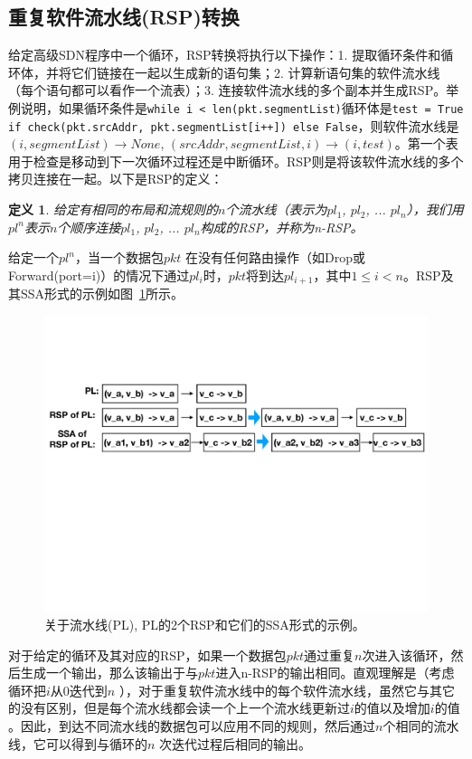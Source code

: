 \documentclass{ctexart}
\newcommand{\codeword}[1]{\texttt{\small{#1}}}
\newtheorem{definition}{定义}
\begin{document}
\subsection{重复软件流水线(RSP)转换}

给定高级SDN程序中一个循环，RSP转换将执行以下操作：1. 提取循环条件和循环体，并将它们链接在一起以生成新的语句集；2. 计算新语句集的软件流水线（每个语句都可以看作一个流表）；3. 连接软件流水线的多个副本并生成RSP。举例说明，如果循环条件是\codeword{while i < len(pkt.segmentList)}循环体是\codeword{test = True if check(pkt.srcAddr, pkt.segmentList[i++]) else False}，则软件流水线是 $(i, segmentList) \rightarrow None$, $(srcAddr, segmentList, i) \rightarrow (i, test)$。第一个表用于检查是移动到下一次循环过程还是中断循环。RSP则是将该软件流水线的多个拷贝连接在一起。以下是RSP的定义：

\begin{definition}
给定有相同的布局和流规则的$n$个流水线（表示为$pl_1$, $pl_2$, ... $pl_n$），我们用$pl^n$表示$n$个顺序连接$pl_1$, $pl_2$, ... $pl_n$构成的RSP，并称为n-RSP。
\end{definition}

给定一个$pl^n$，当一个数据包$pkt$ 在没有任何路由操作（如Drop或Forward(port=i)）的情况下通过$pl_i$时，$pkt$将到达$pl_{i+1}$，其中$1 \leq i < n$。RSP及其SSA形式的示例如图~\ref{fig:pipelines}所示。

\begin{figure}[!htbp]
\includegraphics[width=0.8\linewidth]{figures/lp-66.pdf}
\centering
\vspace{-3mm}
\caption{\small 关于流水线(PL), PL的2个RSP和它们的SSA形式的示例。}
\label{fig:pipelines}
\end{figure}

对于给定的循环及其对应的RSP，如果一个数据包$pkt$通过重复$n$次进入该循环，然后生成一个输出，那么该输出于与$pkt$进入n-RSP的输出相同。直观理解是（考虑循环把$i$从$0$迭代到$n$ ），对于重复软件流水线中的每个软件流水线，虽然它与其它的没有区别，但是每个流水线都会读一个上一个流水线更新过$i$的值以及增加$i$的值 。因此，到达不同流水线的数据包可以应用不同的规则，然后通过$n$个相同的流水线，它可以得到与循环的$n$ 次迭代过程后相同的输出。
\end{document}
